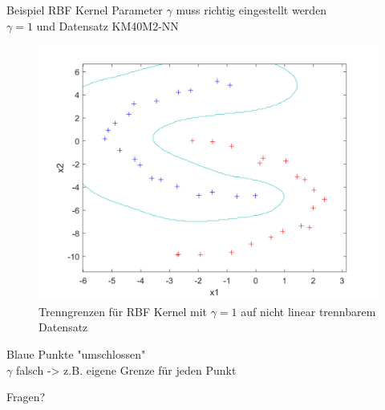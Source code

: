 \documentclass[ngerman]{beamer}
\begin{document}
\begin{frame}{Beispiel RBF Kernel}
    Parameter $\gamma$ muss richtig eingestellt werden \\ \pause
    $\gamma=1$ und Datensatz KM40M2-NN \\ \pause
    \begin{center}
        \begin{figure}
            \includegraphics[width=\textwidth,height=0.7\textheight,keepaspectratio]{../code/octave/images/sgdrbfkernel}
            \caption{Trenngrenzen für RBF Kernel mit $\gamma=1$ auf nicht linear trennbarem Datensatz}
            \label{fig:bsprbfkernel}
        \end{figure}
    \end{center} \pause
    Blaue Punkte "umschlossen" \\ \pause
    $\gamma$ falsch -> z.B. eigene Grenze für jeden Punkt
\end{frame}

\begin{frame}[standout]
	Fragen?
\end{frame}

\begin{frame}
	\printbibliography
\end{frame}
\end{document}
